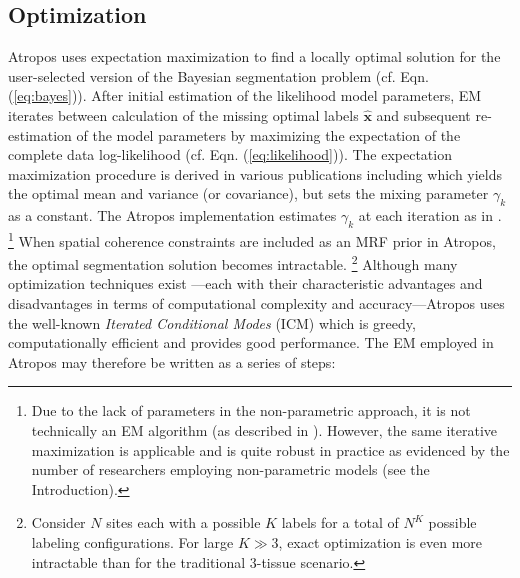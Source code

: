 \documentclass[11pt,english]{article}
\begin{document}
\subsection{Optimization}
Atropos uses expectation maximization to find a locally optimal
solution for the user-selected version of the Bayesian segmentation
problem (cf. Eqn. (\ref{eq:bayes})).
After initial estimation of the
likelihood model parameters, EM iterates between calculation of the
missing optimal labels $\hat{\mathbf{x}}$ and subsequent re-estimation of the model
parameters by maximizing the expectation of the complete data
log-likelihood (cf. Eqn. (\ref{eq:likelihood})).  
The expectation maximization procedure is derived in various
publications including \cite{Zhang2001} which yields the optimal mean
and variance (or covariance), but sets the mixing parameter $\gamma_k$
as a constant.  The Atropos implementation estimates $\gamma_k$ at
each iteration as in \cite{Ashburner2005}.%
\footnote{
Due to the lack of parameters in the non-parametric approach, it is not technically an EM algorithm (as described in \cite{Wells1996}).  However, the same iterative maximization is applicable and is quite robust in practice as evidenced by the number of researchers employing non-parametric models (see the Introduction).
}  
When spatial coherence constraints are included as an MRF prior in Atropos, the optimal segmentation solution becomes intractable.%
\footnote{
Consider $N$ sites each with a possible $K$ labels for a total of $N^K$ possible labeling configurations. For large $K \gg 3$, exact optimization is even more intractable than for the traditional 3-tissue scenario.
}
Although many optimization techniques exist \citep[see the
introduction in][for a concise summary of the myriad optimization
possibilities]{Marroquin2002}---each with their characteristic
advantages and disadvantages in terms of computational complexity and
accuracy---Atropos uses the well-known {\em Iterated Conditional
  Modes} (ICM)  \citep{Besag1986} which is greedy, computationally
efficient and provides good performance.  The EM employed in
Atropos may therefore be written as a series of steps:
\end{document}

